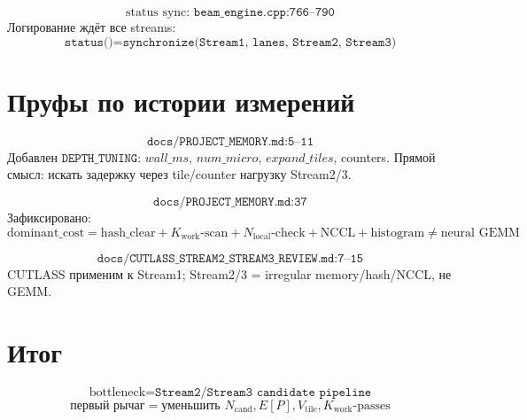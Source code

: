 \documentclass[11pt]{article}
\begin{document}
\[
\text{status sync: }\texttt{beam\_engine.cpp:766--790}
\]
Логирование ждёт все streams:
\[
\texttt{status()}=\texttt{synchronize(Stream1, lanes, Stream2, Stream3)}
\]

\section*{Пруфы по истории измерений}

\[
\texttt{docs/PROJECT\_MEMORY.md:5--11}
\]
Добавлен \(\texttt{DEPTH\_TUNING}\): \(wall\_ms\), \(num\_micro\), \(expand\_tiles\), counters. Прямой смысл: искать задержку через tile/counter нагрузку Stream2/3.

\[
\texttt{docs/PROJECT\_MEMORY.md:37}
\]
Зафиксировано:
\[
\text{dominant\_cost}=\text{hash\_clear}+K_{\text{work}}\text{-scan}+N_{\text{local}}\text{-check}+\text{NCCL}+\text{histogram}
\ne \text{neural GEMM}
\]

\[
\texttt{docs/CUTLASS\_STREAM2\_STREAM3\_REVIEW.md:7--15}
\]
CUTLASS применим к Stream1; Stream2/3 = irregular memory/hash/NCCL, не GEMM.

\section*{Итог}

\[
\boxed{
\text{bottleneck}=\texttt{Stream2/Stream3 candidate pipeline}
}
\]
\[
\boxed{
\text{первый рычаг}=
\text{уменьшить }N_{\text{cand}},E[P],V_{\text{tile}},K_{\text{work}}\text{-passes}
}
\]
\end{document}

